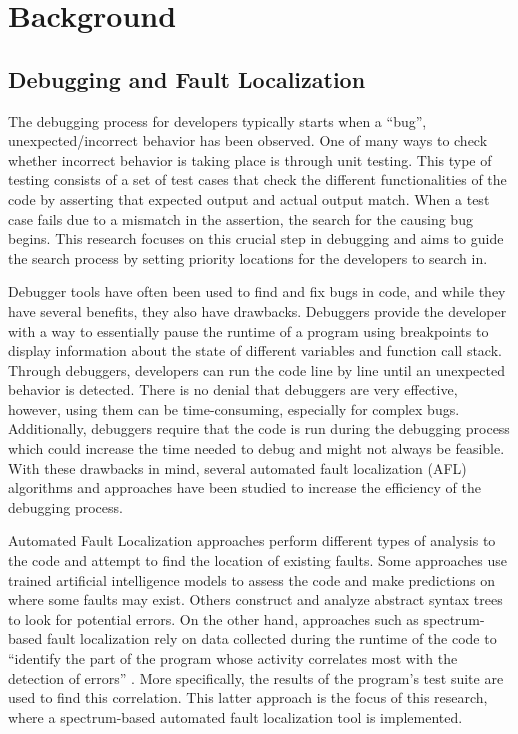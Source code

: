 \section{Background}
\label{sec:background}

\subsection{Debugging and Fault Localization}
\label{subsec:DebuggingAndAFL}

The debugging process for developers typically starts when a ``bug'',
unexpected/incorrect behavior has been observed. One of many ways to check
whether incorrect behavior is taking place is through unit testing. This type of
testing consists of a set of test cases that check the different functionalities of the
code by asserting that expected output and actual output match. When a test case
fails due to a mismatch in the assertion, the search for the causing bug begins.
This research focuses on this crucial step in debugging and aims to guide the
search process by setting priority locations for the developers to search in.

Debugger tools have often been used to find and fix bugs in code, and while they
have several benefits, they also have drawbacks. Debuggers provide the developer
with a way to essentially pause the runtime of a program using breakpoints to display
information about the state of different variables and function call stack.
Through debuggers, developers can run the code line by line until an unexpected
behavior is detected. There is no denial that debuggers are very effective,
however, using them can be time-consuming, especially for complex bugs.
Additionally, debuggers require that the code is run during the debugging
process which could increase the time needed to debug and might not always be
feasible. With these drawbacks in mind, several automated fault localization (AFL)
algorithms and approaches have been studied to increase the
efficiency of the debugging process.

Automated Fault Localization approaches perform different types of analysis to
the code and attempt to find the location of existing faults. Some approaches
use trained artificial intelligence models to assess the code and make
predictions on where some faults may exist. Others construct and analyze
abstract syntax trees to look for potential errors. On the other hand,
approaches such as spectrum-based fault localization rely on data collected
during the runtime of the code to ``identify the part of the program whose
activity correlates most with the detection of errors'' \cite{ABREU20091780}.
More specifically, the results of the program's test suite are used to find this
correlation. This latter approach is the focus of this research, where a
spectrum-based automated fault localization tool is implemented.

